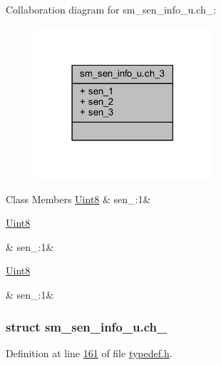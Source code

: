 Collaboration diagram for sm\+\_\+sen\+\_\+info\+\_\+u.\+ch\+\_\+:
\nopagebreak
\begin{figure}[H]
\begin{center}
\leavevmode
\includegraphics[width=186pt]{d7/d03/a00254}
\end{center}
\end{figure}
\begin{DoxyFields}{Class Members}
\hypertarget{a00001_a226219dc5b8b7d5e5d1e7cf59aff4981}{\hyperlink{a00001_a979e3e23b9a449e69ab6a8a83b6042f8}{Uint8}}\label{a00001_a226219dc5b8b7d5e5d1e7cf59aff4981}
&
sen\+\_\+:1&
\\
\hline

\hypertarget{a00001_a7111d63086b336f186d5c29829ed8852}{\hyperlink{a00001_a979e3e23b9a449e69ab6a8a83b6042f8}{Uint8}}\label{a00001_a7111d63086b336f186d5c29829ed8852}
&
sen\+\_\+:1&
\\
\hline

\hypertarget{a00001_a25b93705f9c83a019eb4874d5e07cafd}{\hyperlink{a00001_a979e3e23b9a449e69ab6a8a83b6042f8}{Uint8}}\label{a00001_a25b93705f9c83a019eb4874d5e07cafd}
&
sen\+\_\+:1&
\\
\hline

\end{DoxyFields}
\label{d5/deb/a00132}
\hypertarget{a00001_d5/deb/a00132}{}
\subsubsection{struct sm\+\_\+sen\+\_\+info\+\_\+u.\+ch\+\_}


Definition at line \hyperlink{a00001_source_l00161}{161} of file \hyperlink{a00001_source}{typedef.\+h}.



